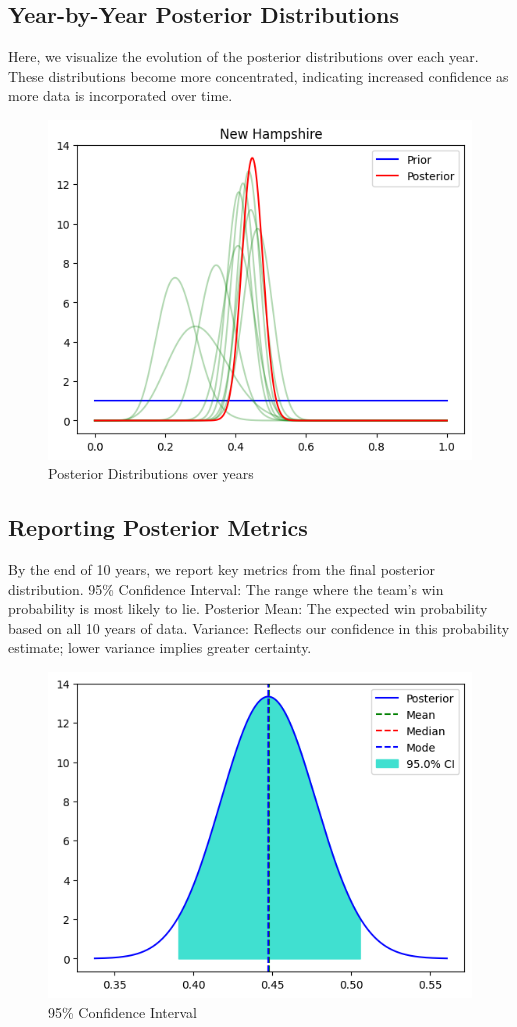 \subsection{Year-by-Year Posterior Distributions}

Here, we visualize the evolution of the posterior distributions over each year.
These distributions become more concentrated, indicating increased confidence as more data is incorporated over time.

\begin{figure}[!ht]
  \centering
  \includegraphics[width=.6\textwidth]{images/posterior-years.png}
  \caption{Posterior Distributions over years}
\end{figure}

\subsection{Reporting Posterior Metrics}

By the end of 10 years, we report key metrics from the final posterior distribution.
95\% Confidence Interval: The range where the team’s win probability is most likely to lie.
Posterior Mean: The expected win probability based on all 10 years of data.
Variance: Reflects our confidence in this probability estimate; lower variance implies greater certainty.

\begin{figure}[!ht]
  \centering
  \includegraphics[width=.6\textwidth]{images/confidence-interval.png}
  \caption{95\% Confidence Interval}
\end{figure}

